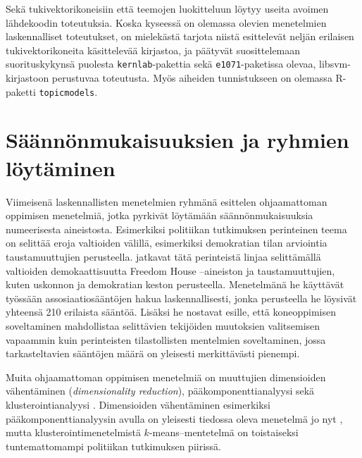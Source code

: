\documentclass[finnish,gradu,twoside,12pt]{tktltiki}
\begin{document}
{Sekä tukivektorikoneisiin että teemojen luokitteluun löytyy useita avoimen lähdekoodin toteutuksia. Koska kyseessä on olemassa olevien menetelmien laskennalliset toteutukset, on mielekästä tarjota niistä  \citet{hornik2006support} esittelevät neljän erilaisen tukivektorikoneita käsittelevää kirjastoa, ja päätyvät suosittelemaan suorituskykynsä puolesta \texttt{kernlab}-pakettia sekä \texttt{e1071}-paketissa olevaa, libsvm-kirjastoon perustuvaa toteutusta. Myös aiheiden tunnistukseen on olemassa R-paketti \texttt{topicmodels}.

\section{Säännönmukaisuuksien ja ryhmien löytäminen}
\label{unsupervised}

Viimeisenä laskennallisten menetelmien ryhmänä esittelen ohjaamattoman oppimisen menetelmiä, jotka pyrkivät löytämään säännönmukaisuuksia numeerisesta aineistosta. Esimerkiksi politiikan tutkimuksen perinteinen teema on selittää eroja valtioiden välillä, esimerkiksi demokratian tilan arviointia taustamuuttujien perusteella. \citet{Jurek2013} jatkavat tätä perinteistä linjaa selittämällä valtioiden demokaattisuutta Freedom House --aineiston ja taustamuuttujien, kuten uskonnon ja demokratian keston perusteella. Menetelmänä he käyttävät työssään assosiaatiosääntöjen hakua laskennallisesti, jonka perusteella he löysivät yhteensä 210 erilaista sääntöä. Lisäksi he nostavat esille, että koneoppimisen soveltaminen mahdollistaa selittävien tekijöiden muutoksien valitsemisen vapaammin kuin perinteisten tilastollisten mentelmien soveltaminen, jossa tarkasteltavien sääntöjen määrä on yleisesti merkittävästi pienempi.

Muita ohjaamattoman oppimisen menetelmiä on muuttujien dimensioiden vähentäminen (\textit{dimensionality reduction}), pääkomponenttianalyysi sekä klusterointianalyysi \citet[485--586]{Hastie2009}. Dimensioiden vähentäminen esimerkiksi pääkomponenttianalyysin avulla on yleisesti tiedossa oleva menetelmä jo nyt \citep[esimerkiksi][615--651]{metsamuuronen}, mutta klusterointimenetelmistä $k$-means--mentetelmä on toistaiseksi tuntemattomampi politiikan tutkimuksen piirissä.




}
\end{document}

